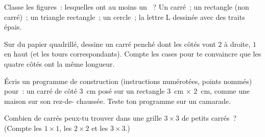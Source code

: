 \begin{exercise}[$\star$]\label{exo:g3:shapes:8}
Classe les figures~: lesquelles ont au moins un ~? Un
carré~; un rectangle (non carré)~; un triangle rectangle~; un
cercle~; la lettre L dessinée avec des traits épais.
\end{exercise}

\begin{exercise}[$\star\star$]\label{exo:g3:shapes:9}
Sur du papier quadrillé, dessine un carré penché dont les
côtés vont \guillemotleft{} $2$ à droite, $1$ en haut
\guillemotright{} (et les tours correspondants). Compte les cases
pour te convaincre que les quatre côtés ont la même longueur.
\end{exercise}

\begin{exercise}[$\star\star$]\label{exo:g3:shapes:10}
Écris un programme de construction (instructions numérotées,
points nommés) pour~: un carré de côté $3$~cm posé sur un
rectangle $3$~cm $\times$ $2$~cm, comme une maison sur son rez-de-
chaussée. Teste ton programme sur un camarade.
\end{exercise}

\begin{exercise}[$\star\star$]\label{exo:g3:shapes:11}
Combien de carrés peux-tu trouver dans une grille $3 \times 3$ de
petits carrés~? (Compte les $1 \times 1$, les $2 \times 2$ et les
$3 \times 3$.)
\end{exercise}
